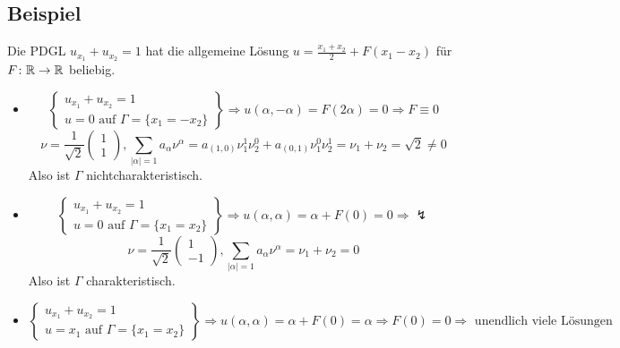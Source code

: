 \subsection{Beispiel}
\label{bsp_1}
	Die PDGL $u_{x_1} + u_{x_2} = 1$ \marginnote{[1]} hat die allgemeine Lösung $u = \frac{x_1+x_2}{2} + F(x_1-x_2)$ für $F\colon \mathbb{R} \rightarrow \mathbb{R}$ beliebig. \begin{itemize}
	\item \[ \left. \begin{cases}
		u_{x_1} + u_{x_2} = 1 \\
		u = 0 \text{ auf } \Gamma = \{x_1 = -x_2\} \end{cases} \right\} \Rightarrow u(\alpha,-\alpha) = F(2\alpha) = 0 \Rightarrow F \equiv 0 \]
	\[ \nu = \frac{1}{\sqrt{2}} \begin{pmatrix} 1 \\ 1 \end{pmatrix}, \sum\limits_{|\alpha| = 1} a_\alpha \nu^\alpha = a_{(1,0)} \nu_1^1 \nu_2^0 + a_{(0,1)} \nu_1^0 \nu_2^1 = \nu_1 + \nu_2 = \sqrt{2} \neq 0 \]
	Also ist $\Gamma$ nichtcharakteristisch.
	\item \[ \left. \begin{cases}
		u_{x_1} + u_{x_2} = 1 \\
		u = 0 \text{ auf } \Gamma = \{x_1 = x_2\} \end{cases} \right\} \Rightarrow u(\alpha,\alpha) = \alpha + F(0) = 0 \Rightarrow \lightning  \]
	\[ \nu = \frac{1}{\sqrt{2}} \begin{pmatrix} 1 \\ -1 \end{pmatrix}, \sum\limits_{|\alpha| = 1} a_\alpha \nu^\alpha = \nu_1 + \nu_2 = 0 \]
	Also ist $\Gamma$ charakteristisch.
	\item \[ \left. \begin{cases}
		u_{x_1} + u_{x_2} = 1 \\
		u = x_1 \text{ auf } \Gamma = \{x_1 = x_2\} \end{cases} \right\} \Rightarrow u(\alpha,\alpha) = \alpha + F(0) = \alpha \Rightarrow F(0)=0 \Rightarrow \text{ unendlich viele Lösungen} \]
	\end{itemize}
\newpage
		